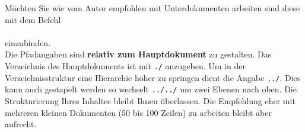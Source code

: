 \renewcommand*{\authorOfNextLines}{Helmut Quinz}
Möchten Sie wie vom Autor empfohlen mit Unterdokumenten arbeiten sind diese mit dem Befehl\\
\verb||\\
einzubinden.\\
Die Pfadangaben sind \textbf{relativ zum Hauptdokument} zu gestalten.
Das Verzeichnis des Hauptdokuments ist mit \verb|./| anzugeben.
Um in der Verzeichnisstruktur eine Hierarchie höher zu springen dient die Angabe \verb|../|.
Dies kann auch gestapelt werden so wechselt \verb|../../| um zwei Ebenen nach oben.
Die Strukturierung Ihres Inhaltes bleibt Ihnen überlassen. 
Die Empfehlung eher mit mehreren kleinen Dokumenten (50 bis 100 Zeilen) zu arbeiten bleibt aber aufrecht.